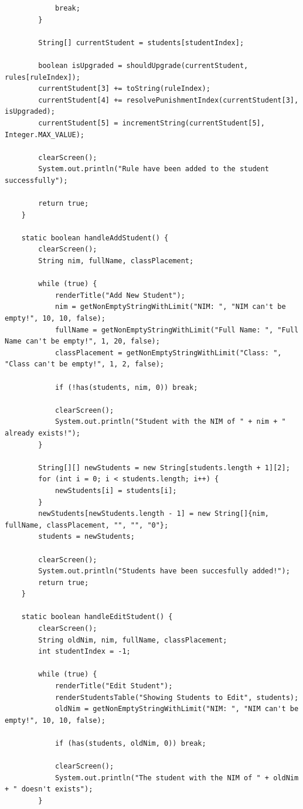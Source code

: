 \documentclass[12pt,titlepage]{article}
\begin{document}
\begin{verbatim}
            break;
        }

        String[] currentStudent = students[studentIndex];

        boolean isUpgraded = shouldUpgrade(currentStudent, rules[ruleIndex]);
        currentStudent[3] += toString(ruleIndex);
        currentStudent[4] += resolvePunishmentIndex(currentStudent[3], isUpgraded);
        currentStudent[5] = incrementString(currentStudent[5], Integer.MAX_VALUE);

        clearScreen();
        System.out.println("Rule have been added to the student successfully");

        return true;
    }

    static boolean handleAddStudent() {
        clearScreen();
        String nim, fullName, classPlacement;

        while (true) {
            renderTitle("Add New Student");
            nim = getNonEmptyStringWithLimit("NIM: ", "NIM can't be empty!", 10, 10, false);
            fullName = getNonEmptyStringWithLimit("Full Name: ", "Full Name can't be empty!", 1, 20, false);
            classPlacement = getNonEmptyStringWithLimit("Class: ", "Class can't be empty!", 1, 2, false);

            if (!has(students, nim, 0)) break;

            clearScreen();
            System.out.println("Student with the NIM of " + nim + " already exists!");
        }

        String[][] newStudents = new String[students.length + 1][2];
        for (int i = 0; i < students.length; i++) {
            newStudents[i] = students[i];
        }
        newStudents[newStudents.length - 1] = new String[]{nim, fullName, classPlacement, "", "", "0"};
        students = newStudents;

        clearScreen();
        System.out.println("Students have been succesfully added!");
        return true;
    }

    static boolean handleEditStudent() {
        clearScreen();
        String oldNim, nim, fullName, classPlacement;
        int studentIndex = -1;

        while (true) {
            renderTitle("Edit Student");
            renderStudentsTable("Showing Students to Edit", students);
            oldNim = getNonEmptyStringWithLimit("NIM: ", "NIM can't be empty!", 10, 10, false);

            if (has(students, oldNim, 0)) break;

            clearScreen();
            System.out.println("The student with the NIM of " + oldNim + " doesn't exists");
        }


\end{verbatim}
\end{document}
